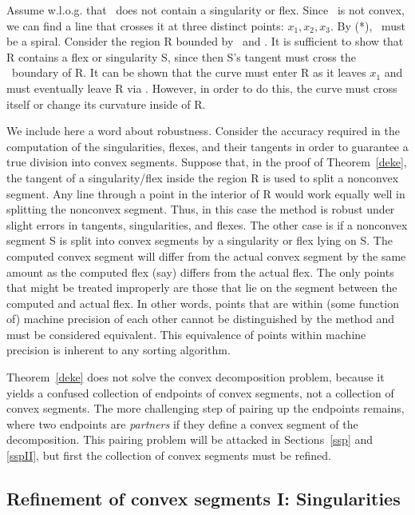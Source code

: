 Assume w.l.o.g. that \ does
\marginpar{(*)}
not contain a singularity or flex.
Since \ is not convex, we can find a line that crosses it at
three distinct points: $x_{1}, x_{2}, x_{3}$.
By (*), \ must be a spiral.
Consider the region R bounded by \ and .
It is sufficient to show that R contains a flex or singularity S,
since then S's tangent must cross the \ boundary of R.
It can be shown that the curve must enter R as it leaves $x_{1}$ and
must eventually leave R via .
However, in order to do this, the curve must cross itself or change its
curvature inside of R.
\QED
\fi

We include here a word about robustness.
Consider the accuracy required in the computation of the singularities, flexes, 
and their tangents in order to guarantee a true division into convex segments.
Suppose that, in the proof of Theorem~\ref{deke}, the tangent of a 
singularity/flex inside the region R is used to split a nonconvex segment.
Any line through a point in the interior of R would work equally well in splitting
the nonconvex segment.
Thus, in this case the method is robust under slight errors in tangents, singularities,
and flexes.
The other case is if a nonconvex segment S is split into convex segments by a 
singularity or flex lying on S. 
The computed convex segment will differ from the actual convex segment by the same
amount as the computed flex (say) differs from the actual flex.
The only points that might be treated improperly are those that lie on the segment
between the computed and actual flex.
In other words, points that are within (some function of) machine precision 
of each other cannot be distinguished by the method and must be considered 
equivalent.
This equivalence of points within machine precision is inherent to any sorting 
algorithm.

Theorem~\ref{deke} does not solve the convex decomposition problem,
because it yields a confused collection of endpoints of convex segments, 
not a collection of convex segments.
The more challenging step of pairing up the endpoints remains, where
two endpoints are {\em partners} if they define a convex segment of the 
decomposition.
This pairing problem will be attacked in Sections~\ref{ssp} 
and \ref{sspII}, but first the collection of convex segments must be 
refined.

\subsection{Refinement of convex segments I: Singularities}
\label{sec-refine1}

